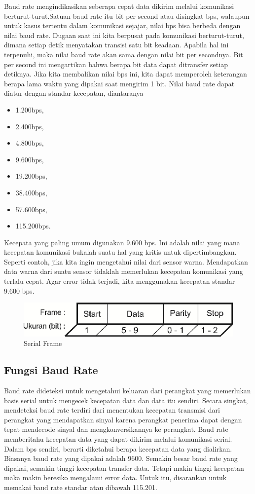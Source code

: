 Baud rate mengindikasikan seberapa cepat data dikirim melalui komunikasi berturut-turut.Satuan baud rate itu bit per second atau disingkat bps, walaupun untuk kasus tertentu dalam komunikasi sejajar, nilai bps bisa berbeda dengan nilai baud rate. Dugaan saat ini kita berpusat pada komunikasi berturut-turut, dimana setiap detik menyatakan transisi satu bit keadaan. Apabila hal ini terpenuhi, maka nilai baud rate akan sama dengan nilai bit per secondnya. Bit per second ini mengartikan bahwa berapa bit data dapat ditransfer setiap detiknya. Jika kita membalikan nilai bps ini, kita dapat memperoleh keterangan berapa lama waktu yang dipakai saat mengirim 1 bit. Nilai baud rate dapat diatur dengan standar kecepatan, diantaranya 
\begin {itemize}
	\item 1.200bps,
	\item 2.400bps, 
	\item 4.800bps, 
	\item 9.600bps, 
	\item 19.200bps, 
	\item 38.400bps, 
	\item 57.600bps,
	\item 115.200bps. 
\end {itemize}	
	Kecepata yang paling umum digunakan 9.600 bps. Ini adalah nilai yang mana kecepatan komunikasi bukalah suatu hal yang kritis untuk dipertimbangkan. Seperti contoh, jika kita ingin mengetahui nilai dari sensor warna. Mendapatkan data warna dari suatu sensor tidaklah memerlukan kecepatan komunikasi yang terlalu cepat. Agar  error tidak terjadi, kita menggunakan kecepatan standar 9.600 bps.

\begin{figure}[ht]
	\centerline{\includegraphics[width=1\textwidth]{figures/serialframe.png}}
	\caption{Serial Frame}
	\label{serialframe}
\end{figure}	
\subsection{Fungsi Baud Rate}
Baud rate dideteksi untuk mengetahui keluaran dari perangkat yang memerlukan basis serial untuk mengecek kecepatan data dan data itu sendiri. \cite{anderson1973method} Secara singkat, mendeteksi baud rate terdiri dari menentukan kecepatan transmisi dari perangkat yang mendapatkan sinyal karena perangkat penerima dapat dengan tepat mendecode sinyal dan mengkonversikannya ke perangkat. Baud rate memberitahu kecepatan data yang dapat dikirim melalui komunikasi serial. Dalam bps sendiri, berarti diketahui berapa kecepatan data yang dialirkan. Biasanya baud rate yang dipakai adalah 9600. Semakin besar baud rate yang dipakai, semakin tinggi kecepatan transfer data. Tetapi makin tinggi kecepatan maka makin beresiko mengalami error data. Untuk itu, disarankan untuk memakai baud rate standar atau dibawah 115.201.

